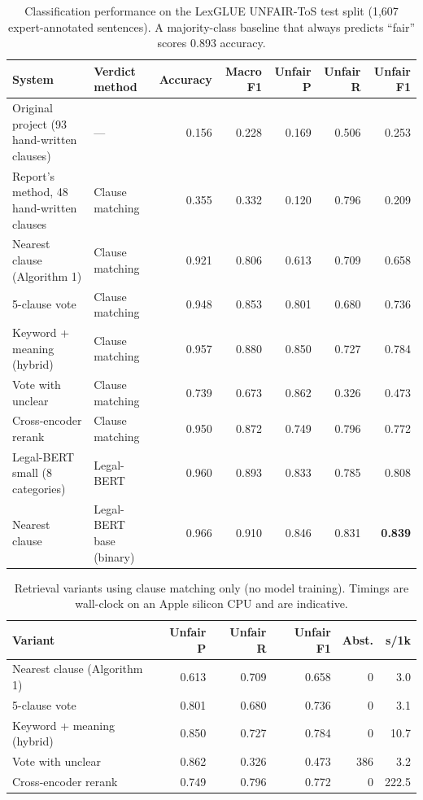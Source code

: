 \begin{table}[!t]
\centering
\caption{Classification performance on the LexGLUE UNFAIR-ToS test split (1,607 expert-annotated sentences).
A majority-class baseline that always predicts ``fair'' scores 0.893 accuracy.}
\label{tab:system-comparison}
\footnotesize
\begin{tabular}{llrrrrr}
\toprule
System & Verdict method & Accuracy & Macro F1 & Unfair P & Unfair R & Unfair F1 \\
\midrule
Original project (93 hand-written clauses) & --- & 0.156 & 0.228 & 0.169 & 0.506 & 0.253 \\
Report's method, 48 hand-written clauses & Clause matching & 0.355 & 0.332 & 0.120 & 0.796 & 0.209 \\
Nearest clause (Algorithm 1) & Clause matching & 0.921 & 0.806 & 0.613 & 0.709 & 0.658 \\
5-clause vote & Clause matching & 0.948 & 0.853 & 0.801 & 0.680 & 0.736 \\
Keyword + meaning (hybrid) & Clause matching & 0.957 & 0.880 & 0.850 & 0.727 & 0.784 \\
Vote with unclear & Clause matching & 0.739 & 0.673 & 0.862 & 0.326 & 0.473 \\
Cross-encoder rerank & Clause matching & 0.950 & 0.872 & 0.749 & 0.796 & 0.772 \\
Legal-BERT small (8 categories) & Legal-BERT & 0.960 & 0.893 & 0.833 & 0.785 & 0.808 \\
Nearest clause & Legal-BERT base (binary) & 0.966 & 0.910 & 0.846 & 0.831 & \textbf{0.839} \\
\bottomrule
\end{tabular}
\end{table}

\begin{table}[!t]
\centering
\caption{Retrieval variants using clause matching only (no model training).
Timings are wall-clock on an Apple silicon CPU and are indicative.}
\label{tab:retrieval-variants}
\footnotesize
\begin{tabular}{lrrrrr}
\toprule
Variant & Unfair P & Unfair R & Unfair F1 & Abst. & s/1k \\
\midrule
Nearest clause (Algorithm 1) & 0.613 & 0.709 & 0.658 & 0 & 3.0 \\
5-clause vote & 0.801 & 0.680 & 0.736 & 0 & 3.1 \\
Keyword + meaning (hybrid) & 0.850 & 0.727 & 0.784 & 0 & 10.7 \\
Vote with unclear & 0.862 & 0.326 & 0.473 & 386 & 3.2 \\
Cross-encoder rerank & 0.749 & 0.796 & 0.772 & 0 & 222.5 \\
\bottomrule
\end{tabular}
\end{table}

